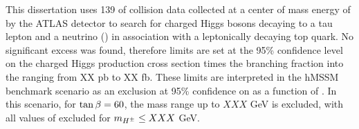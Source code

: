 

This dissertation uses 139 \ifb of \pp collision data collected at a center of mass energy of \sqs by the ATLAS detector to search for charged Higgs bosons decaying to a tau lepton and a neutrino (\HpmLong) in association with a leptonically decaying top quark. No significant excess was found, therefore limits are set at the 95\% confidence level on the charged Higgs production cross section times the branching fraction into the \taunu ranging from XX pb to XX fb. These limits are interpreted in the hMSSM benchmark scenario as an exclusion at 95\% confidence on \tanb as a function of \mHpm. In this scenario, for $\tan\beta=60$, the \Hpm mass range up to $XXX$ GeV is excluded, with all values of \tanb excluded for $m_{H^{\pm}} \leq XXX$ GeV.